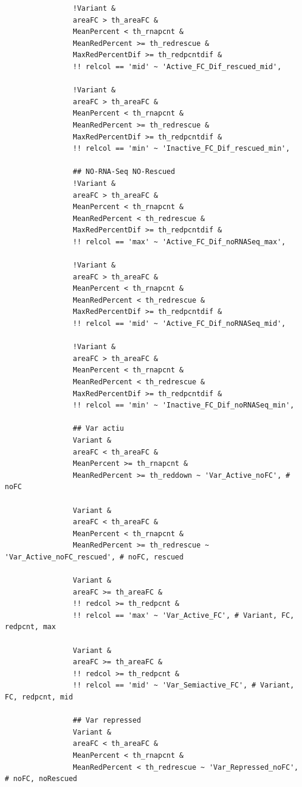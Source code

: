 \documentclass[11pt]{article}
\begin{document}
\begin{verbatim}
                !Variant &
                areaFC > th_areaFC &
                MeanPercent < th_rnapcnt &
                MeanRedPercent >= th_redrescue &
                MaxRedPercentDif >= th_redpcntdif &
                !! relcol == 'mid' ~ 'Active_FC_Dif_rescued_mid',

                !Variant &
                areaFC > th_areaFC &
                MeanPercent < th_rnapcnt &
                MeanRedPercent >= th_redrescue &
                MaxRedPercentDif >= th_redpcntdif &
                !! relcol == 'min' ~ 'Inactive_FC_Dif_rescued_min',

                ## NO-RNA-Seq NO-Rescued
                !Variant &
                areaFC > th_areaFC &
                MeanPercent < th_rnapcnt &
                MeanRedPercent < th_redrescue &
                MaxRedPercentDif >= th_redpcntdif &
                !! relcol == 'max' ~ 'Active_FC_Dif_noRNASeq_max',

                !Variant &
                areaFC > th_areaFC &
                MeanPercent < th_rnapcnt &
                MeanRedPercent < th_redrescue &
                MaxRedPercentDif >= th_redpcntdif &
                !! relcol == 'mid' ~ 'Active_FC_Dif_noRNASeq_mid',

                !Variant &
                areaFC > th_areaFC &
                MeanPercent < th_rnapcnt &
                MeanRedPercent < th_redrescue &
                MaxRedPercentDif >= th_redpcntdif &
                !! relcol == 'min' ~ 'Inactive_FC_Dif_noRNASeq_min',

                ## Var actiu
                Variant &
                areaFC < th_areaFC &
                MeanPercent >= th_rnapcnt &
                MeanRedPercent >= th_reddown ~ 'Var_Active_noFC', # noFC

                Variant &
                areaFC < th_areaFC &
                MeanPercent < th_rnapcnt &
                MeanRedPercent >= th_redrescue ~ 'Var_Active_noFC_rescued', # noFC, rescued

                Variant &
                areaFC >= th_areaFC &
                !! redcol >= th_redpcnt &
                !! relcol == 'max' ~ 'Var_Active_FC', # Variant, FC, redpcnt, max

                Variant &
                areaFC >= th_areaFC &
                !! redcol >= th_redpcnt &
                !! relcol == 'mid' ~ 'Var_Semiactive_FC', # Variant, FC, redpcnt, mid

                ## Var repressed
                Variant &
                areaFC < th_areaFC &
                MeanPercent < th_rnapcnt &
                MeanRedPercent < th_redrescue ~ 'Var_Repressed_noFC', # noFC, noRescued


\end{verbatim}
\end{document}

